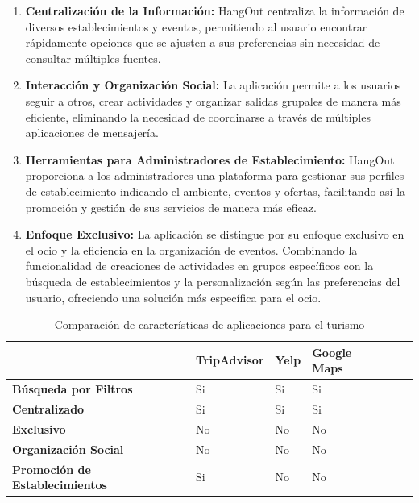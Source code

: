 \begin{enumerate}
    \item \textbf{Centralización de la Información:} HangOut centraliza la información de diversos establecimientos y eventos, permitiendo al usuario encontrar rápidamente opciones que se ajusten a sus preferencias sin necesidad de consultar múltiples fuentes.

    \item \textbf{Interacción y Organización Social:} La aplicación permite a los usuarios seguir a otros, crear actividades y organizar salidas grupales de manera más eficiente, eliminando la necesidad de coordinarse a través de múltiples aplicaciones de mensajería.

    \item \textbf{Herramientas para Administradores de Establecimiento:} HangOut proporciona a los administradores una plataforma para gestionar sus perfiles de establecimiento indicando el ambiente, eventos y ofertas, facilitando así la promoción y gestión de sus servicios de manera más eficaz.

    \item \textbf{Enfoque Exclusivo:} La aplicación se distingue por su enfoque exclusivo en el ocio y la eficiencia en la organización de eventos. Combinando la funcionalidad de creaciones de actividades en grupos específicos con la búsqueda de establecimientos y la personalización según las preferencias del usuario, ofreciendo una solución más específica para el ocio.
\end{enumerate}

\begin{table}[H]
    \centering
    \label{tab:comparison}
    \small
    \begin{tabularx}{\textwidth}{|X|X|X|X|X|X|}
        \hline
                                               & \textbf{TripAdvisor} & \textbf{Yelp} & \textbf{Google Maps} \\ \hline
        \textbf{Búsqueda por Filtros}          & Si                   & Si            & Si                   \\ \hline
        \textbf{Centralizado}                  & Si                   & Si            & Si                   \\ \hline
        \textbf{Exclusivo}                     & No                   & No            & No                   \\ \hline
        \textbf{Organización Social}           & No                   & No            & No                   \\ \hline
        \textbf{Promoción de Establecimientos} & Si                   & No            & No                   \\ \hline
    \end{tabularx}
    \caption{Comparación de características de aplicaciones para el turismo}

\end{table}


